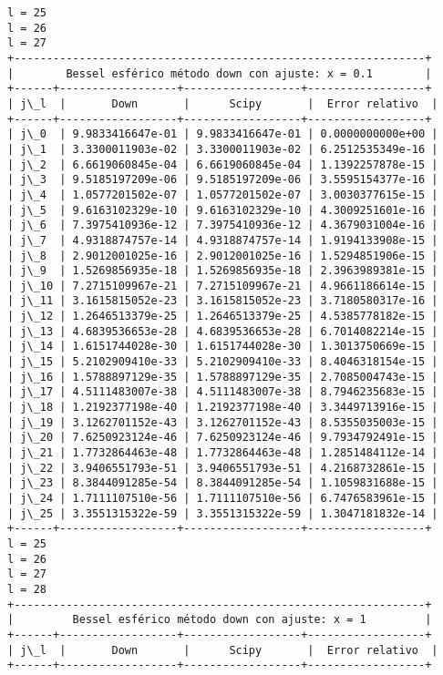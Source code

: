 \documentclass[9pt]{article}
\begin{document}
    \begin{Verbatim}[commandchars=\\\{\}]
l = 25
l = 26
l = 27
+---------------------------------------------------------------+
|        Bessel esférico método down con ajuste: x = 0.1        |
+------+------------------+------------------+------------------+
| j\_l  |       Down       |      Scipy       |  Error relativo  |
+------+------------------+------------------+------------------+
| j\_0  | 9.9833416647e-01 | 9.9833416647e-01 | 0.0000000000e+00 |
| j\_1  | 3.3300011903e-02 | 3.3300011903e-02 | 6.2512535349e-16 |
| j\_2  | 6.6619060845e-04 | 6.6619060845e-04 | 1.1392257878e-15 |
| j\_3  | 9.5185197209e-06 | 9.5185197209e-06 | 3.5595154377e-16 |
| j\_4  | 1.0577201502e-07 | 1.0577201502e-07 | 3.0030377615e-15 |
| j\_5  | 9.6163102329e-10 | 9.6163102329e-10 | 4.3009251601e-16 |
| j\_6  | 7.3975410936e-12 | 7.3975410936e-12 | 4.3679031004e-16 |
| j\_7  | 4.9318874757e-14 | 4.9318874757e-14 | 1.9194133908e-15 |
| j\_8  | 2.9012001025e-16 | 2.9012001025e-16 | 1.5294851906e-15 |
| j\_9  | 1.5269856935e-18 | 1.5269856935e-18 | 2.3963989381e-15 |
| j\_10 | 7.2715109967e-21 | 7.2715109967e-21 | 4.9661186614e-15 |
| j\_11 | 3.1615815052e-23 | 3.1615815052e-23 | 3.7180580317e-16 |
| j\_12 | 1.2646513379e-25 | 1.2646513379e-25 | 4.5385778182e-15 |
| j\_13 | 4.6839536653e-28 | 4.6839536653e-28 | 6.7014082214e-15 |
| j\_14 | 1.6151744028e-30 | 1.6151744028e-30 | 1.3013750669e-15 |
| j\_15 | 5.2102909410e-33 | 5.2102909410e-33 | 8.4046318154e-15 |
| j\_16 | 1.5788897129e-35 | 1.5788897129e-35 | 2.7085004743e-15 |
| j\_17 | 4.5111483007e-38 | 4.5111483007e-38 | 8.7946235683e-15 |
| j\_18 | 1.2192377198e-40 | 1.2192377198e-40 | 3.3449713916e-15 |
| j\_19 | 3.1262701152e-43 | 3.1262701152e-43 | 8.5355035003e-15 |
| j\_20 | 7.6250923124e-46 | 7.6250923124e-46 | 9.7934792491e-15 |
| j\_21 | 1.7732864463e-48 | 1.7732864463e-48 | 1.2851484112e-14 |
| j\_22 | 3.9406551793e-51 | 3.9406551793e-51 | 4.2168732861e-15 |
| j\_23 | 8.3844091285e-54 | 8.3844091285e-54 | 1.1059831688e-15 |
| j\_24 | 1.7111107510e-56 | 1.7111107510e-56 | 6.7476583961e-15 |
| j\_25 | 3.3551315322e-59 | 3.3551315322e-59 | 1.3047181832e-14 |
+------+------------------+------------------+------------------+
l = 25
l = 26
l = 27
l = 28
+---------------------------------------------------------------+
|         Bessel esférico método down con ajuste: x = 1         |
+------+------------------+------------------+------------------+
| j\_l  |       Down       |      Scipy       |  Error relativo  |
+------+------------------+------------------+------------------+

\end{Verbatim}
\end{document}
